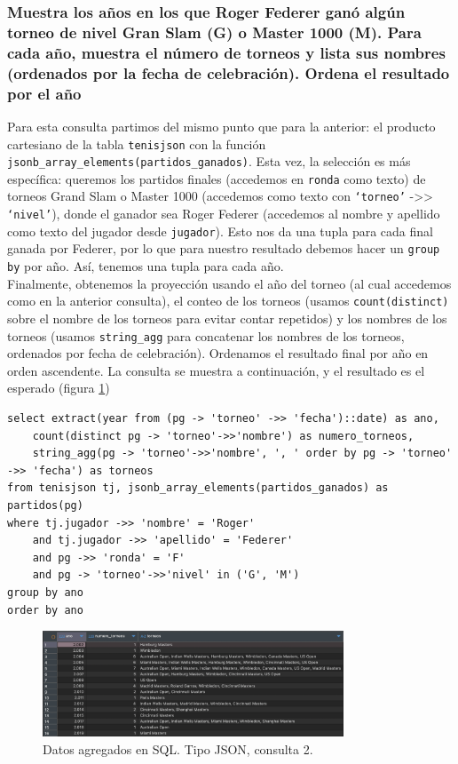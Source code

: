 \subsubsection{Muestra los años en los que Roger Federer ganó algún torneo de nivel Gran Slam (G) o Master 1000 (M). Para cada año, muestra el número de torneos y lista sus nombres (ordenados por la fecha de celebración). Ordena el resultado por el año}

Para esta consulta partimos del mismo punto que para la anterior: el producto cartesiano de la tabla \texttt{tenisjson} con la función \texttt{jsonb\_array\_elements(partidos\_ganados)}. Esta vez, la selección es más específica: queremos los partidos finales (accedemos en \texttt{ronda} como texto) de torneos Grand Slam o Master 1000 (accedemos como texto con \texttt{`torneo'} ->> \texttt{`nivel'}), donde el ganador sea Roger Federer (accedemos al nombre y apellido como texto del jugador desde \texttt{jugador}). Esto nos da una tupla para cada final ganada por Federer, por lo que para nuestro resultado debemos hacer un \texttt{group by} por año. Así, tenemos una tupla para cada año. \\

Finalmente, obtenemos la proyección usando el año del torneo (al cual accedemos como en la anterior consulta), el conteo de los torneos (usamos \texttt{count(distinct)} sobre el nombre de los torneos para evitar contar repetidos) y los nombres de los torneos (usamos \texttt{string\_agg} para concatenar los nombres de los torneos, ordenados por fecha de celebración). Ordenamos el resultado final por año en orden ascendente. La consulta se muestra a continuación, y el resultado es el esperado (figura \ref{fig:q2_json})

\begin{verbatim}
select extract(year from (pg -> 'torneo' ->> 'fecha')::date) as ano,
    count(distinct pg -> 'torneo'->>'nombre') as numero_torneos,
    string_agg(pg -> 'torneo'->>'nombre', ', ' order by pg -> 'torneo' ->> 'fecha') as torneos
from tenisjson tj, jsonb_array_elements(partidos_ganados) as partidos(pg)
where tj.jugador ->> 'nombre' = 'Roger'
    and tj.jugador ->> 'apellido' = 'Federer'
    and pg ->> 'ronda' = 'F'
    and pg -> 'torneo'->>'nivel' in ('G', 'M')
group by ano
order by ano
\end{verbatim}

\begin{figure}[H]
\centering
\includegraphics[width=0.8\textwidth]{fotos/q2_json.png}
\caption{Datos agregados en SQL. Tipo JSON, consulta 2.}
\label{fig:q2_json}
\end{figure}



